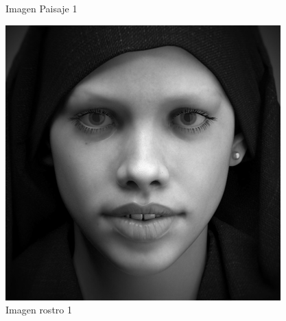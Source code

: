 \documentclass{article}
\begin{document}
\begin{figure}[H]
  \caption{Imagen Paisaje 1}\label{fig:paisaje_1}
\endminipage\hfill
{}%
  \includegraphics[width=\linewidth]{rostro_1}
  \caption{Imagen rostro 1}\label{fig:rostro_1}
\endminipage
\end{figure}
\end{document}
